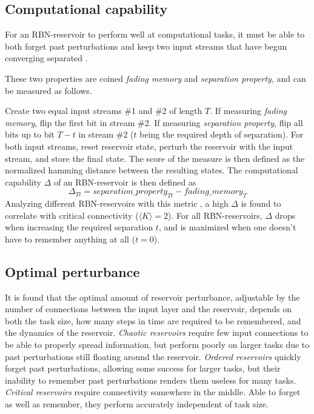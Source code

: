 \subsection{Computational capability}
\label{section:computational-capability}
For an RBN-reservoir to perform well at computational tasks,
it must be able to both forget past perturbations and keep two input streams that have begun converging separated \cite{bertschinger2004real}.

These two properties are coined \textit{fading memory} and \textit{separation property},
and can be measured \cite{rbn-reservoir} as follows.

Create two equal input streams \#1 and \#2 of length $T$.
If measuring \textit{fading memory}, flip the first bit in stream \#2.
If measuring \textit{separation property}, flip all bits up to bit $T-t$ in stream \#2
($t$ being the required depth of separation).
For both input streams, reset reservoir state, perturb the reservoir with the input stream,
and store the final state.
The score of the measure is then defined as the normalized hamming distance between the resulting states.
The computational capability $\Delta$ of an RBN-reservoir is then defined as
\begin{equation}
  \Delta_{Tt} = separation\_property_{Tt} - fading\_memory_{T}
\label{formula:accuracy}
\end{equation}
Analyzing different RBN-reservoirs with this metric \cite{rbn-reservoir},
a high $\Delta$ is found to correlate with critical connectivity ($\langle K \rangle = 2$).
For all RBN-reservoirs, $\Delta$ drops when increasing the required separation $t$,
and is maximized when one doesn't have to remember anything at all ($t=0$).

\subsection{Optimal perturbance}
\label{section:optimal-perturbance}
It is found that the optimal amount of reservoir perturbance,
adjustable by the number of connections between the input layer and the reservoir,
depends on both the task size, how many steps in time are required to be remembered,
and the dynamics of the reservoir.
\textit{Chaotic reservoirs} require few input connections to be able to properly spread information,
but perform poorly on larger tasks due to past perturbations still floating around the reservoir.
\textit{Ordered reservoirs} quickly forget past perturbations, allowing some success for larger tasks,
but their inability to remember past perturbations renders them useless for many tasks.
\textit{Critical reservoirs} require connectivity somewhere in the middle.
Able to forget as well as remember, they perform accurately independent of task size.

